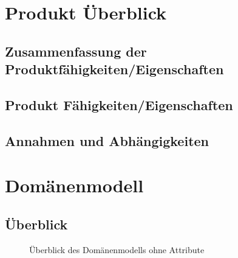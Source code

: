 \documentclass[a4paper,12pt,twoside]{scrreprt}
\begin{document}
    \chapter{Produkt Überblick}
    
    \section{Zusammenfassung der Produktfähigkeiten/Eigenschaften}
    
    \section{Produkt Fähigkeiten/Eigenschaften}
    


    \section{Annahmen und Abhängigkeiten}

    \chapter{Domänenmodell}
    \section{Überblick}
    \begin{figure}[ht!]
        \begin{center}
            \caption{Überblick des Domänenmodells ohne Attribute}\label{domainmodel}
        \end{center}
    \end{figure}
    \newpage
\end{document}
